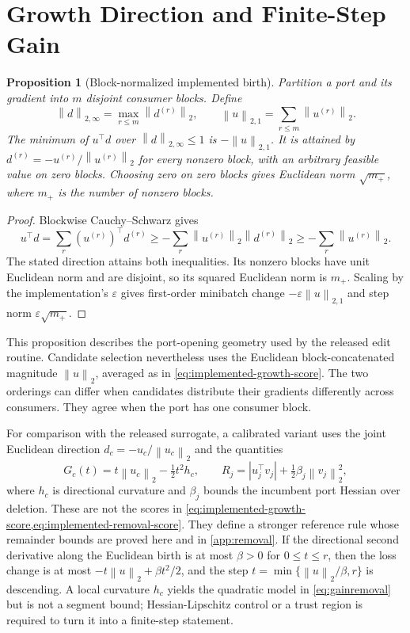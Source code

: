 \documentclass[10pt]{article}
\theoremstyle{paper}
\newtheorem{proposition}[theorem]{Proposition}
\newcommand{\norm}[1]{\left\lVert #1\right\rVert}
\begin{document}
\section{Growth Direction and Finite-Step Gain}
\label{app:growth}
\begin{proposition}[Block-normalized implemented birth]
\label{prop:blockbirth}
Partition a port and its gradient into $m$ disjoint consumer blocks. Define
\[
\norm d_{2,\infty}=\max_{r\le m}\norm{d^{(r)}}_2,
\qquad
\norm u_{2,1}=\sum_{r\le m}\norm{u^{(r)}}_2.
\]
The minimum of $u^\top d$ over $\norm d_{2,\infty}\le1$ is $-\norm u_{2,1}$. It is attained by $d^{(r)}=-u^{(r)}/\norm{u^{(r)}}_2$ for every nonzero block, with an arbitrary feasible value on zero blocks. Choosing zero on zero blocks gives Euclidean norm $\sqrt{m_+}$, where $m_+$ is the number of nonzero blocks.
\end{proposition}
\begin{proof}
Blockwise Cauchy--Schwarz gives
\[
u^\top d=\sum_r(u^{(r)})^\top d^{(r)}
\ge-\sum_r\norm{u^{(r)}}_2\norm{d^{(r)}}_2
\ge-\sum_r\norm{u^{(r)}}_2.
\]
The stated direction attains both inequalities. Its nonzero blocks have unit Euclidean norm and are disjoint, so its squared Euclidean norm is $m_+$. Scaling by the implementation's $\varepsilon$ gives first-order minibatch change $-\varepsilon\norm u_{2,1}$ and step norm $\varepsilon\sqrt{m_+}$.
\end{proof}

This proposition describes the port-opening geometry used by the released edit routine. Candidate selection nevertheless uses the Euclidean block-concatenated magnitude $\norm u_2$, averaged as in \cref{eq:implemented-growth-score}. The two orderings can differ when candidates distribute their gradients differently across consumers. They agree when the port has one consumer block.

For comparison with the released surrogate, a calibrated variant uses the joint Euclidean direction $d_c=-u_c/\norm{u_c}_2$ and the quantities
\begin{equation}
G_c(t)=t\norm{u_c}_2-\tfrac12t^2h_c,
\qquad R_j=|u_j^\top v_j|+\tfrac12\beta_j\norm{v_j}_2^2,
\label{eq:gainremoval}
\end{equation}
where $h_c$ is directional curvature and $\beta_j$ bounds the incumbent port Hessian over deletion. These are not the scores in \cref{eq:implemented-growth-score,eq:implemented-removal-score}. They define a stronger reference rule whose remainder bounds are proved here and in \cref{app:removal}. If the directional second derivative along the Euclidean birth is at most $\beta>0$ for $0\le t\le r$, then the loss change is at most $-t\norm u_2+\beta t^2/2$, and the step $t=\min\{\norm u_2/\beta,r\}$ is descending. A local curvature $h_c$ yields the quadratic model in \cref{eq:gainremoval} but is not a segment bound; Hessian-Lipschitz control or a trust region is required to turn it into a finite-step statement.
\end{document}
